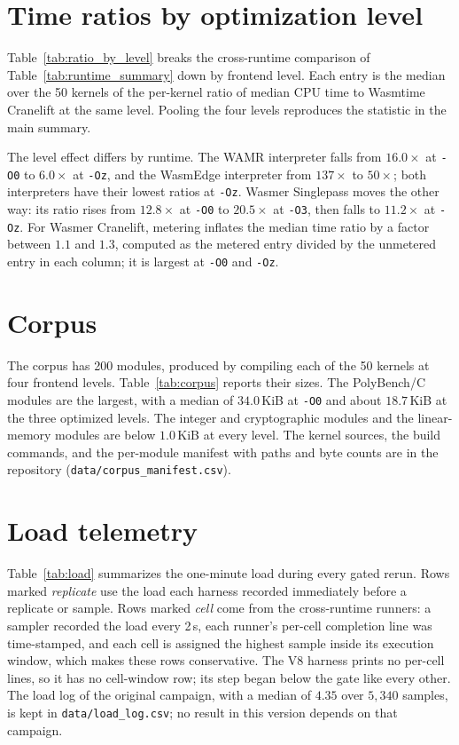 \documentclass{ws-jcsc}
\begin{document}


\section{Time ratios by optimization level}\label{app:ratios}
Table~\ref{tab:ratio_by_level} breaks the cross-runtime comparison of Table~\ref{tab:runtime_summary} down by frontend level. Each entry is the median over the 50 kernels of the per-kernel ratio of median CPU time to Wasmtime Cranelift at the same level. Pooling the four levels reproduces the statistic in the main summary.

The level effect differs by runtime. The WAMR interpreter falls from $16.0\times$ at \texttt{-O0} to $6.0\times$ at \texttt{-Oz}, and the WasmEdge interpreter from $137\times$ to $50\times$; both interpreters have their lowest ratios at \texttt{-Oz}. Wasmer Singlepass moves the other way: its ratio rises from $12.8\times$ at \texttt{-O0} to $20.5\times$ at \texttt{-O3}, then falls to $11.2\times$ at \texttt{-Oz}. For Wasmer Cranelift, metering inflates the median time ratio by a factor between $1.1$ and $1.3$, computed as the metered entry divided by the unmetered entry in each column; it is largest at \texttt{-O0} and \texttt{-Oz}.



\section{Corpus}\label{app:corpus}
The corpus has 200 modules, produced by compiling each of the 50 kernels at four frontend levels. Table~\ref{tab:corpus} reports their sizes. The PolyBench/C modules are the largest, with a median of $34.0$\,KiB at \texttt{-O0} and about $18.7$\,KiB at the three optimized levels. The integer and cryptographic modules and the linear-memory modules are below $1.0$\,KiB at every level. The kernel sources, the build commands, and the per-module manifest with paths and byte counts are in the repository (\texttt{data/corpus\_manifest.csv}).



\section{Load telemetry}\label{app:load}
Table~\ref{tab:load} summarizes the one-minute load during every gated rerun. Rows marked \emph{replicate} use the load each harness recorded immediately before a replicate or sample. Rows marked \emph{cell} come from the cross-runtime runners: a sampler recorded the load every 2\,s, each runner's per-cell completion line was time-stamped, and each cell is assigned the highest sample inside its execution window, which makes these rows conservative. The V8 harness prints no per-cell lines, so it has no cell-window row; its step began below the gate like every other. The load log of the original campaign, with a median of $4.35$ over $5{,}340$ samples, is kept in \texttt{data/load\_log.csv}; no result in this version depends on that campaign.
\end{document}
